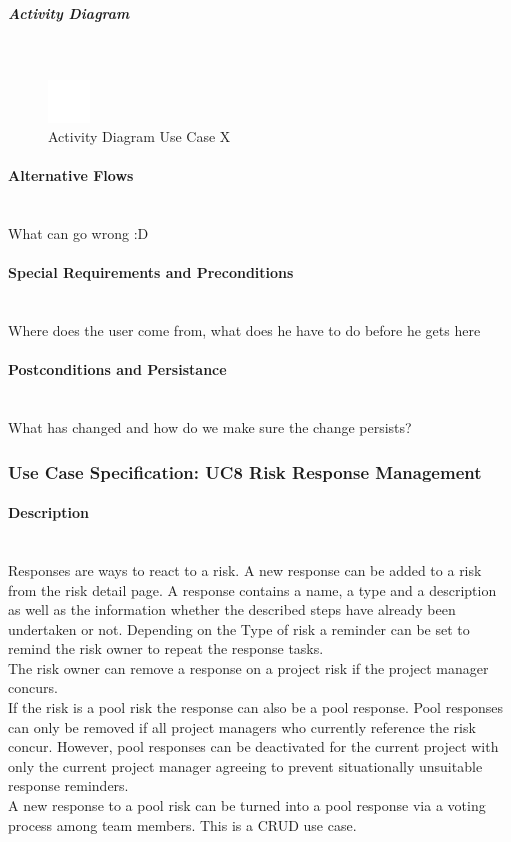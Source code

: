 \subparagraph{Activity Diagram}\mbox{}\\
\begin{figure}[h]
	\centering
	\includegraphics[width=0.1\textwidth]{Content/Domain/placeholder.png}
	\caption{Activity Diagram Use Case X}
	\label{fig:label77}
\end{figure}

\paragraph*{Alternative Flows}\mbox{}\\
What can go wrong :D

\paragraph*{Special Requirements and Preconditions}\mbox{}\\
Where does the user come from, what does he have to do before he gets here

\paragraph*{Postconditions and Persistance}\mbox{}\\
What has changed and how do we make sure the change persists?

\newpage
\subsubsection{Use Case Specification: \ac{UC}8 Risk Response Management}
\label{sec:domainBbi}

\paragraph*{Description}\mbox{}\\
Responses are ways to react to a risk. A new response can be added to a risk from the risk detail page. A response contains a name, a type and a description as well as the information whether the described steps have already been undertaken or not. Depending on the Type of risk a reminder can be set to remind the risk owner to repeat the response tasks.\\
The risk owner can remove a response on a project risk if the project manager concurs.\\
If the risk is a pool risk the response can also be a pool response. Pool responses can only be removed if all project managers who currently reference the risk concur. However, pool responses can be deactivated for the current project with only the current project manager agreeing to prevent situationally unsuitable response reminders.\\
A new response to a pool risk can be turned into a pool response via a voting process among team members.
This is a CRUD use case.

